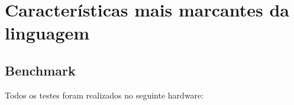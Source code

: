 \chapter{Características mais marcantes da linguagem}


\section{Benchmark}


Todos os testes foram realizados no seguinte hardware:
\newpage